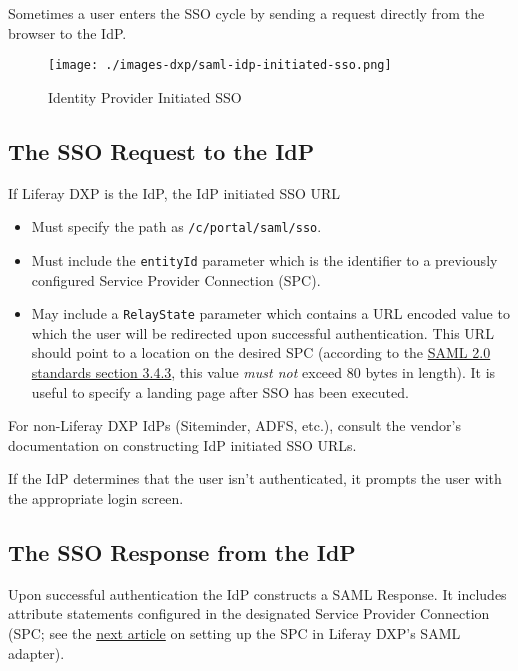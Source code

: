 Sometimes a user enters the SSO cycle by sending a request directly from
the browser to the IdP.

\begin{figure}
\centering
\texttt{[image: ./images-dxp/saml-idp-initiated-sso.png]}
\caption{Identity Provider Initiated SSO}
\end{figure}

\subsection{The SSO Request to the IdP}\label{the-sso-request-to-the-idp}

If Liferay DXP is the IdP, the IdP initiated SSO URL

\begin{itemize}
\tightlist
\item
  Must specify the path as \texttt{/c/portal/saml/sso}.
\item
  Must include the \texttt{entityId} parameter which is the identifier
  to a previously configured Service Provider Connection (SPC).
\item
  May include a \texttt{RelayState} parameter which contains a URL
  encoded value to which the user will be redirected upon successful
  authentication. This URL should point to a location on the desired SPC
  (according to the
  \href{https://docs.oasis-open.org/security/saml/v2.0/saml-bindings-2.0-os.pdf}{SAML
  2.0 standards section 3.4.3}, this value \emph{must not} exceed 80
  bytes in length). It is useful to specify a landing page after SSO has
  been executed.
\end{itemize}

For non-Liferay DXP IdPs (Siteminder, ADFS, etc.), consult the vendor's
documentation on constructing IdP initiated SSO URLs.

If the IdP determines that the user isn't authenticated, it prompts the
user with the appropriate login screen.

\subsection{The SSO Response from the
IdP}\label{the-sso-response-from-the-idp}

Upon successful authentication the IdP constructs a SAML Response. It
includes attribute statements configured in the designated Service
Provider Connection (SPC; see the
\href{/docs/7-0/user/-/knowledge_base/u/setting-up-saml}{next article}
on setting up the SPC in Liferay DXP's SAML adapter).

